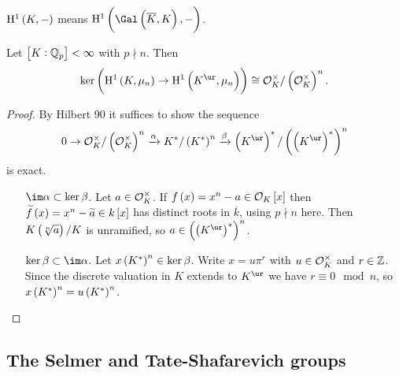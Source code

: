 \begin{notation*}
$ \H^1\br{K, -} $ means $ \H^1\br{\Gal\br{\overline{K}, K}, -} $.
\end{notation*}

\begin{lemma}
\label{lem:15.3}
Let $ \sbr{K : \QQ_p} < \infty $ with $ p \nmid n $. Then
$$ \ker \br{\H^1\br{K, \mu_n} \to \H^1\br{K^{\ur}, \mu_n}} \cong \OOO_K^\times / \br{\OOO_K^\times}^n. $$
\end{lemma}

\begin{proof}
By Hilbert 90 it suffices to show the sequence
$$ 0 \to \OOO_K^\times / \br{\OOO_K^\times}^n \xrightarrow{\alpha} K^* / \br{K^*}^n \xrightarrow{\beta} \br{K^{\ur}}^* / \br{\br{K^{\ur}}^*}^n $$
is exact.
\begin{itemize}[leftmargin=1in]
\item[$ \im \alpha \subset \ker \beta $.] Let $ a \in \mathcal{O}_K^\times $. If $ f\br{x} = x^n - a \in \OOO_K\sbr{x} $ then $ \widetilde{f}\br{x} = x^n - \widetilde{a} \in k\sbr{x} $ has distinct roots in $ \overline{k} $, using $ p \nmid n $ here. Then $ K\br{\sqrt[n]{a}} / K $ is unramified, so $ a \in \br{\br{K^{\ur}}^*}^n $.
\item[$ \ker \beta \subset \im \alpha $.] Let $ x\br{K^*}^n \in \ker \beta $. Write $ x = u\pi^r $ with $ u \in \mathcal{O}_K^\times $ and $ r \in \mathbb{Z} $. Since the discrete valuation in $ K $ extends to $ K^{\ur} $ we have $ r \equiv 0 \mod n $, so $ x\br{K^*}^n = u\br{K^*}^n $.
\end{itemize}
\end{proof}

\pagebreak

\subsection{The Selmer and Tate-Shafarevich groups}


